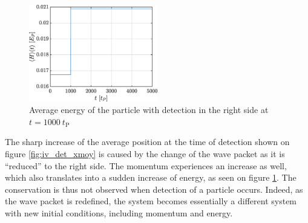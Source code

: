 \documentclass[a4paper,12pt,twoside]{article}
\begin{document}
\begin{figure}[h!]
\centering
 \includegraphics[width=0.5\textwidth]{graphs/iv_det_H.eps}
 \caption{Average energy of the particle with detection in the right side at $t=1000~t_\text{P}$}
 \label{fig:iv_det_H}
\end{figure}

The sharp increase of the average position at the time of detection shown on figure \ref{fig:iv_det_xmoy} is caused by the change of the wave packet as it is ``reduced'' to the right side. The momentum experiences an increase as well, which also translates into a sudden increase of energy, as seen on figure \ref{fig:iv_det_H}. The conservation is thus not observed when detection of a particle occurs. Indeed, as the wave packet is redefined, the system becomes essentially a different system with new initial conditions, including momentum and energy.
\end{document}
